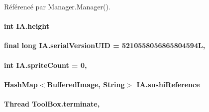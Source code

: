 Référencé par Manager.\+Manager().

\hypertarget{classIA_a96c12173b130e4e03d8bb75495bae440}{}
\paragraph[{height}]{\setlength{\rightskip}{0pt plus 5cm}int I\+A.\+height\hspace{0.3cm}{\ttfamily [private]}}\label{classIA_a96c12173b130e4e03d8bb75495bae440}
\hypertarget{classIA_a04d11d2607138e2a8edf27ca8d4ad23d}{}
\paragraph[{serial\+Version\+U\+I\+D}]{\setlength{\rightskip}{0pt plus 5cm}final long I\+A.\+serial\+Version\+U\+I\+D = 5210558056865804594\+L\hspace{0.3cm}{\ttfamily [static]}, {\ttfamily [private]}}\label{classIA_a04d11d2607138e2a8edf27ca8d4ad23d}
\hypertarget{classIA_aab9d3e69748c6640a5d56874a033c17d}{}
\paragraph[{sprite\+Count}]{\setlength{\rightskip}{0pt plus 5cm}int I\+A.\+sprite\+Count = 0\hspace{0.3cm}{\ttfamily [static]}, {\ttfamily [private]}}\label{classIA_aab9d3e69748c6640a5d56874a033c17d}
\hypertarget{classIA_abb06bcb730d01ee856e68c60c7c9539c}{}
\paragraph[{sushi\+Reference}]{\setlength{\rightskip}{0pt plus 5cm}Hash\+Map$<$Buffered\+Image, String$>$ I\+A.\+sushi\+Reference\hspace{0.3cm}{\ttfamily [private]}}\label{classIA_abb06bcb730d01ee856e68c60c7c9539c}
\hypertarget{classToolBox_a4a4a941d9d6b7892fab6299754098d16}{}
\paragraph[{terminate}]{\setlength{\rightskip}{0pt plus 5cm}Thread Tool\+Box.\+terminate\hspace{0.3cm}{\ttfamily [package]}, {\ttfamily [inherited]}}\label{classToolBox_a4a4a941d9d6b7892fab6299754098d16}
\hypertarget{classIA_ab31d73d4297034d5a8fddc6ae1cd5c46}{}
